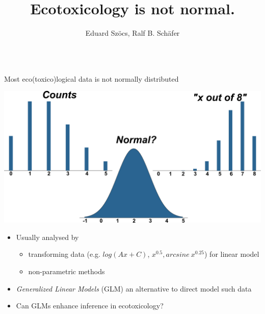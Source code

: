 \documentclass[final,t]{beamer}
\title{Ecotoxicology is not normal.}
\author{Eduard Sz\"ocs, Ralf B. Sch\"afer}
\institute{Institute for Environmental Sciences, University Koblenz-Landau}
\begin{document}
\begin{frame}{}
\begin{columns}[t]
\begin{column}{.48\linewidth}

    \begin{exampleblock}{Most eco(toxico)logical data is not normally distributed}
        \begin{center}
          \includegraphics[width=0.7\linewidth]{fig/distr.png}
        \end{center}

        \begin{itemize}
            \item Usually analysed by \\[0.5ex]
                \begin{itemize}
                    \item transforming data (e.g. $log(Ax + C)$, $x^{0.5}, arcsine~x^{0.25}$) for linear model \cite{newman_quantitative_2012}
                    \item non-parametric methods \cite{wang_making_2011}
                \end{itemize}
            \item \emph{Generalized Linear Models} (GLM) an alternative to direct model such data
            \item Can GLMs enhance inference in ecotoxicology?
        \end{itemize}
    \end{exampleblock}



\end{column}
\end{columns}
\end{frame}
\end{document}

